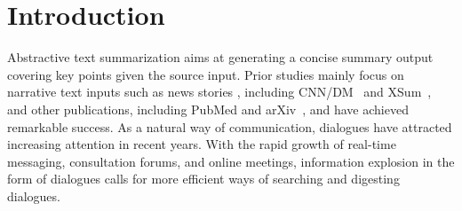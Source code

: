 
\section{Introduction}

Abstractive text summarization aims at generating a concise summary output covering key points given the source input.
Prior studies mainly focus on narrative text inputs such as news stories 
, including CNN/DM~\cite{hermann2015teaching} and XSum~\cite{narayan2018don}, 
and other publications, including PubMed and 
arXiv~\cite{cohan2018discourse}, and have achieved remarkable success.  
As a natural way of communication, dialogues have attracted 
increasing attention in recent years. 
With the rapid growth of real-time messaging, consultation 
forums, and online meetings,
information explosion in the form of dialogues calls for more efficient 
ways of searching and digesting dialogues.



